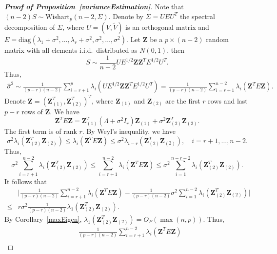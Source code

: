 \documentclass[review]{elsarticle}
\newcommand{\bZ}{\mathbf{Z}}
\theoremstyle{plain}
\theoremstyle{definition}
\theoremstyle{remark}
\begin{document}
\begin{proof}[\textbf{Proof of Proposition~\ref{varianceEstimation}}]
    Note that $(n-2)S\sim \mathrm{Wishart}_p (n-2,\Sigma)$.
    Denote by $\Sigma=UEU^T$ the spectral decomposition of $\Sigma$, where $U=(V,\tilde{V})$ is an orthogonal matrix and $E=\mathrm{diag}(\lambda_1+\sigma^2,\ldots,\lambda_r+\sigma^2,\sigma^2,\ldots,\sigma^2)$.
    Let $\bZ$ be a $p\times (n-2)$ random matrix with all elements i.i.d.\ distributed as $N(0,1)$, then
    $$
        S\sim \frac{1}{n-2} U E^{1/2} \bZ \bZ^T E^{1/2} U^T.
    $$
    Thus,
    \begin{equation*}
        \begin{aligned}
            \hat{\sigma}^2\sim
            \frac{1}{(p-r)(n-2)}\sum_{i=r+1}^p \lambda_i (U E^{1/2} \bZ \bZ^T E^{1/2} U^T)
            =
            \frac{1}{(p-r)(n-2)}\sum_{i=r+1}^{n-2} \lambda_i ( \bZ^T E \bZ).
        \end{aligned}
    \end{equation*}
    Denote $\bZ={(\bZ_{(1)}^T,\bZ_{(2)}^T)}^T$, where $\bZ_{(1)}$ and $\bZ_{(2)}$ are the first $r$ rows and last $p-r$ rows of $\bZ$. We have
    $$
    \bZ^T E \bZ =\bZ_{(1)}^T (\Lambda +\sigma^2 I_r) \bZ_{(1)}+\sigma^2 \bZ_{(2)}^T \bZ_{(2)}.
    $$
 The first term is of rank $r$. By Weyl's inequality, we have
    $$
    \sigma^2\lambda_i(\bZ_{(2)}^T \bZ_{(2)}) \leq \lambda_i(\bZ^T E \bZ)\leq
    \sigma^2\lambda_{i-r}(\bZ_{(2)}^T \bZ_{(2)}),
    \quad
    \textrm{$i=r+1,\ldots, n-2$}.
    $$
    Thus,
    $$
    \sigma^2\sum_{i=r+1}^{n-2}\lambda_i(\bZ_{(2)}^T \bZ_{(2)}) \leq \sum_{i=r+1}^{n-2}\lambda_i(\bZ^T E \bZ)\leq
    \sigma^2\sum_{i=1}^{n-r-2}\lambda_{i}(\bZ_{(2)}^T \bZ_{(2)}).
    $$
     It follows that
     \begin{equation*}
         \begin{aligned}
             &\Big|\frac{1}{(p-r)(n-2)}\sum_{i=r+1}^{n-2}\lambda_i(\bZ^T E \bZ)-
    \frac{1}{(p-r)(n-2)} \sigma^2\sum_{i=1}^{n-2}\lambda_{i}(\bZ_{(2)}^T \bZ_{(2)})\Big|
             \\
             \leq & r\sigma^2\frac{1}{(p-r)(n-2)} \lambda_1 (\bZ_{(2)}^T \bZ_{(2)}).
         \end{aligned}
     \end{equation*}
    By Corollary~\ref{maxEigen}, $\lambda_1 (\bZ_{(2)}^T \bZ_{(2)})=O_P(\max(n,p))$. 
    Thus,
     \begin{equation*}
         \begin{aligned}
             &\frac{1}{(p-r)(n-2)}\sum_{i=r+1}^{n-2}\lambda_i(\bZ^T E \bZ)\\

\end{aligned}
\end{equation*}
\end{proof}
\end{document}
